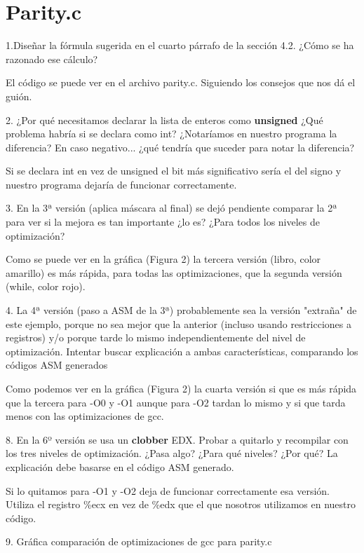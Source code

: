 \documentclass{article}
\begin{document}
  \section{Parity.c}
    \begin{flushleft}
      {\large 1.Diseñar la fórmula sugerida en el cuarto párrafo de la sección 4.2.
      ¿Cómo se ha razonado ese cálculo?} \break

      El código se puede ver en el archivo parity.c. \break
      Siguiendo los consejos que nos dá el guión.  \break

      {\large 2. ¿Por qué necesitamos declarar la lista de enteros como \textbf{unsigned}
      ¿Qué problema habría si se declara como int? ¿Notaríamos en nuestro programa la diferencia?
      En caso negativo... ¿qué tendría que suceder para notar la diferencia?} \break

      Si se declara int en vez de unsigned el bit más significativo sería el del signo y nuestro programa
      dejaría de funcionar correctamente. \break

      {\large 3. En la 3ª versión (aplica máscara al final) se dejó pendiente comparar la 2ª para ver
      si la mejora es tan importante ¿lo es? ¿Para todos los niveles de optimización?} \break

      Como se puede ver en la gráfica (Figura 2) la tercera versión (libro, color amarillo) es más rápida,
      para todas las optimizaciones, que la segunda versión (while, color rojo). \break

      {\large 4. La 4ª versión (paso a ASM de la 3ª) probablemente sea la versión "extraña" de
      este ejemplo, porque no sea mejor que la anterior (incluso usando restricciones a registros)
      y/o porque tarde lo mismo independientemente del nivel de optimización. Intentar buscar
      explicación a ambas características, comparando los códigos ASM generados} \break


      Como podemos ver en la gráfica (Figura 2) la cuarta versión si que es más rápida que
      la tercera para -O0 y -O1 aunque para -O2 tardan lo mismo y si que tarda menos con las
      optimizaciones de gcc. \break

      {\large 8. En la 6º versión se usa un \textbf{clobber} EDX. Probar a quitarlo y recompilar
      con los tres niveles de optimización. ¿Pasa algo? ¿Para qué niveles? ¿Por qué? La explicación
      debe basarse en el código ASM generado.} \break

      Si lo quitamos para -O1 y -O2 deja de funcionar correctamente esa versión. \break
      Utiliza el registro \%ecx en vez de \%edx que el que nosotros utilizamos en nuestro código. \break

      {\large 9. Gráfica comparación de optimizaciones de gcc para parity.c}
    \end{flushleft}
\end{document}
